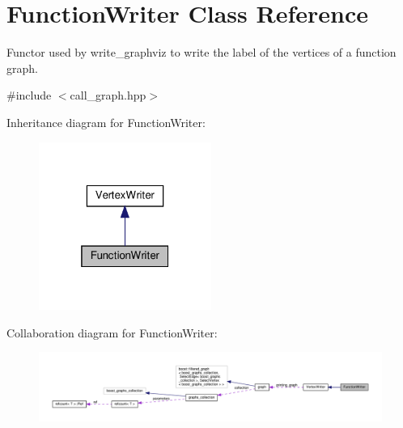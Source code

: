 \hypertarget{classFunctionWriter}{}\section{Function\+Writer Class Reference}
\label{classFunctionWriter}


Functor used by write\+\_\+graphviz to write the label of the vertices of a function graph.  




{\ttfamily \#include $<$call\+\_\+graph.\+hpp$>$}



Inheritance diagram for Function\+Writer\+:
\nopagebreak
\begin{figure}[H]
\begin{center}
\leavevmode
\includegraphics[width=160pt]{dc/de5/classFunctionWriter__inherit__graph}
\end{center}
\end{figure}


Collaboration diagram for Function\+Writer\+:
\nopagebreak
\begin{figure}[H]
\begin{center}
\leavevmode
\includegraphics[width=350pt]{db/d86/classFunctionWriter__coll__graph}
\end{center}
\end{figure}
